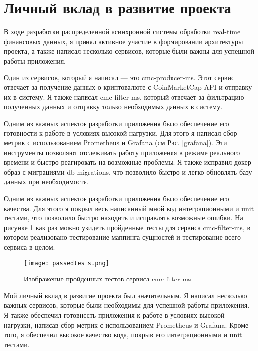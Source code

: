 \section{Личный вклад в развитие проекта}

В ходе разработки распределенной асинхронной системы обработки real-time
финансовых данных, я принял активное участие в формировании архитектуры проекта,
а также написал несколько сервисов, которые были важны для успешной работы
приложения.

Один из сервисов, который я написал --- это cmc-producer-ms. Этот сервис
отвечает за получение данных о криптовалюте с CoinMarketCap API и отправку их в
систему. Я также написал cmc-filter-ms, который отвечает за фильтрацию
полученных данных и отправку только необходимых данных в систему.

Одним из важных аспектов разработки приложения было обеспечение его
готовности к работе в условиях высокой нагрузки. Для этого я написал сбор метрик
с использованием Prometheus и Grafana (см Рис. \ref{grafana}).
Эти инструменты позволяют отслеживать
работу приложения в режиме реального времени и быстро реагировать на возможные
проблемы. Я также исправил докер образ с миграциями db-migrations, что позволило
быстро и легко обновлять базу данных при необходимости.

Одним из важных аспектов разработки приложения было обеспечение его
качества. Для этого я покрыл весь написанный мной код интеграционными и unit
тестами, что позволило быстро находить и исправлять возможные ошибки.
На рисунке \ref{tests} как раз можно увидеть пройденные тесты для сервиса cmc-filter-ms,
в котором реализовано тестирование маппинга сущностей и тестирование всего сервиса в целом.

\begin{figure}[h]
    \centering
    \texttt{[image: passedtests.png]}
    \caption{Изображение пройденных тестов сервиса cmc-filter-ms.}
    \label{tests}
\end{figure}

Мой личный вклад в развитие проекта был значительным. Я написал несколько
важных сервисов, которые были необходимы для успешной работы приложения. Я также
обеспечил готовность приложения к работе в условиях высокой нагрузки, написав
сбор метрик с использованием Prometheus и Grafana. Кроме того, я обеспечил
высокое качество кода, покрыв его интеграционными и unit тестами.